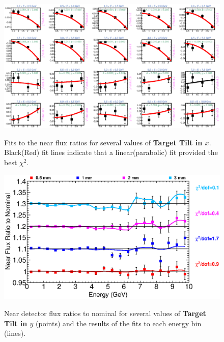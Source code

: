 \begin{figure}[ht]
  \begin{center}
    {\includegraphics[width=5.0in]{figures/TargetXTilt_near_fits.eps}}
  \end{center}
\caption{ Fits to the near flux ratios for several values of {\bf Target Tilt in $x$}. Black(Red) fit lines indicate that a linear(parabolic) fit provided the best $\chi^2$. }
\end{figure}

\clearpage

\begin{figure}[ht]
  \begin{center}
    {\includegraphics[width=6.0in]{figures/TargetYTilt_near_summary.eps}}
  \end{center}
\caption{ Near detector flux ratios to nominal for several values of {\bf Target Tilt in $y$} (points) and the results of the fits to each energy bin (lines).}
\end{figure}

